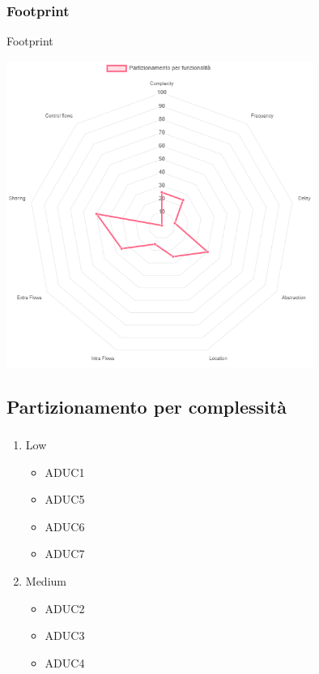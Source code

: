 \documentclass{beamer}
\begin{document}
	\subsubsection{Footprint}
	\begin{frame}{Footprint}
		\begin{center}
			\includegraphics[width=0.75\textwidth, height=0.75\textheight, keepaspectratio=true]{part_funz.png}
		\end{center}
	\end{frame}

	\subsection{Partizionamento per complessità}\label{part_compl}
	\begin{frame}
		\frametitle{}
		\begin{block}{}
			\begin{enumerate}
				\item Low
				\begin{itemize}
					\item ADUC1
					\item ADUC5
					\item ADUC6
					\item ADUC7
				\end{itemize}
				\item Medium
				\begin{itemize}
					\item ADUC2
					\item ADUC3
					\item ADUC4
				\end{itemize}
			\end{enumerate}
		\end{block}
	\end{frame}
\end{document}
